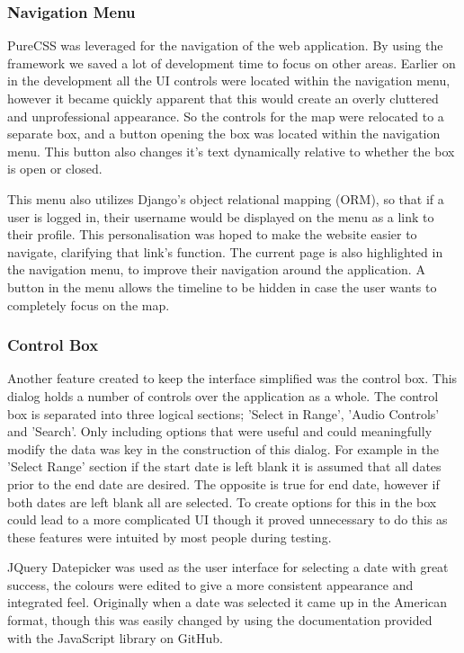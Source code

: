 \documentclass{l3proj}
\begin{document}
\subsubsection{Navigation Menu}		PureCSS was leveraged for the navigation of the web application. By using the framework we saved a lot of development time to focus on other areas. Earlier on in the development all the UI controls were located within the navigation menu, however it became quickly apparent that this would create an overly cluttered and unprofessional appearance. So the controls for the map were relocated to a separate box, and a button opening the box was located within the navigation menu. This button also changes it's text dynamically relative to whether the box is open or closed.

This menu also utilizes Django's object relational mapping (ORM), so that if a user is logged in, their username would be displayed on the menu as a link to their profile. This personalisation was hoped to make the website easier to navigate, clarifying that link's function. The current page is also highlighted in the navigation menu, to improve their navigation around the application. A button in the menu allows the timeline to be hidden in case the user wants to completely focus on the map.

\subsubsection{Control Box}		Another feature created to keep the interface simplified was the control box. This dialog holds a number of controls over the application as a whole. The control box is separated into three logical sections; 'Select in Range', 'Audio Controls' and 'Search'. Only including options that were useful and could meaningfully modify the data was key in the construction of this dialog. For example in the 'Select Range' section if the start date is left blank it is assumed that all dates prior to the end date are desired. The opposite is true for end date, however if both dates are left blank all are selected. To create options for this in the box could lead to a more complicated UI though it proved unnecessary to do this as these features were intuited by most people during testing.

\gls{JQuery} Datepicker was used as the user interface for selecting a date with great success, the colours were edited to give a more consistent appearance and integrated feel. Originally when a date was selected it came up in the American format, though this was easily changed by using the documentation provided with the JavaScript library on GitHub.
\end{document}
